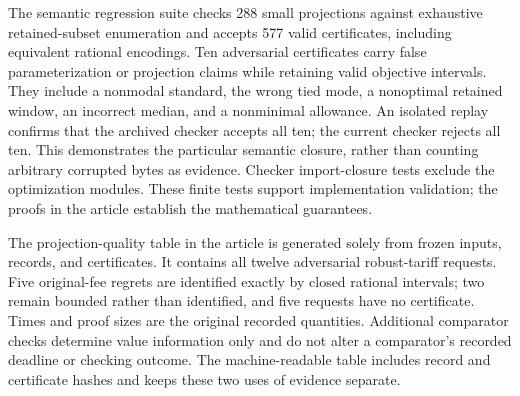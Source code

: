 The semantic regression suite checks 288 small projections against exhaustive retained-subset enumeration and accepts 577 valid certificates, including equivalent rational encodings. Ten adversarial certificates carry false parameterization or projection claims while retaining valid objective intervals. They include a nonmodal standard, the wrong tied mode, a nonoptimal retained window, an incorrect median, and a nonminimal allowance. An isolated replay confirms that the archived checker accepts all ten; the current checker rejects all ten. This demonstrates the particular semantic closure, rather than counting arbitrary corrupted bytes as evidence. Checker import-closure tests exclude the optimization modules. These finite tests support implementation validation; the proofs in the article establish the mathematical guarantees.

The projection-quality table in the article is generated solely from frozen inputs, records, and certificates. It contains all twelve adversarial robust-tariff requests. Five original-fee regrets are identified exactly by closed rational intervals; two remain bounded rather than identified, and five requests have no certificate. Times and proof sizes are the original recorded quantities. Additional comparator checks determine value information only and do not alter a comparator's recorded deadline or checking outcome. The machine-readable table includes record and certificate hashes and keeps these two uses of evidence separate.
